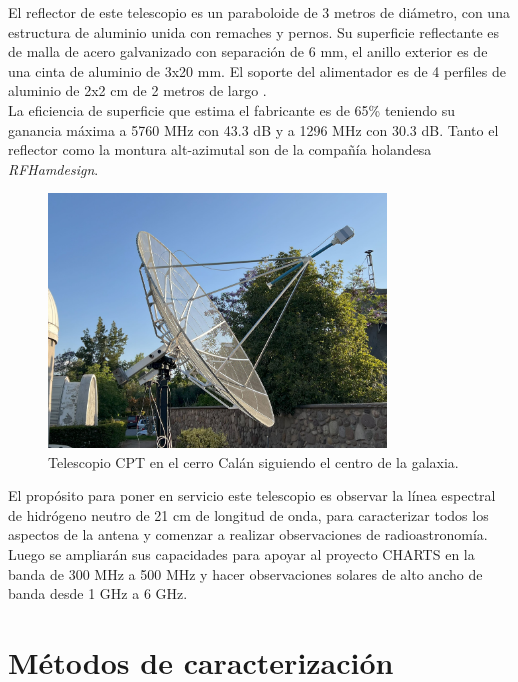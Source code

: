 El reflector de este telescopio es un paraboloide de 3 metros de diámetro, con una estructura de aluminio unida con remaches y pernos. Su superficie reflectante es de malla de acero galvanizado con separación de 6 mm, el anillo exterior es de una cinta de aluminio de 3x20 mm. El soporte del alimentador es de 4 perfiles de aluminio de 2x2 cm de 2 metros de largo \cite{rfhamdesign3meterdish}.\\

La eficiencia de superficie que estima el fabricante es de 65\% teniendo su ganancia máxima a 5760 MHz con 43.3 dB y a 1296 MHz con 30.3 dB. Tanto el reflector como la montura alt-azimutal son de la compañía holandesa \textit{RFHamdesign}.\\

\begin{figure}
    \centering
    \includegraphics[width = 0.8\textwidth]{img/cpt_tracking}
    \caption{Telescopio CPT en el cerro Calán siguiendo el centro de la galaxia.}
    \label{fig:cpt}
\end{figure}

El propósito para poner en servicio este telescopio es observar la línea espectral de hidrógeno neutro de 21 cm de longitud de onda, para caracterizar todos los aspectos de la antena y comenzar a realizar observaciones de radioastronomía. Luego se ampliarán sus capacidades para apoyar al proyecto CHARTS en la banda de 300 MHz a 500 MHz y hacer observaciones solares de alto ancho de banda desde 1 GHz a 6 GHz.\\

\section{Métodos de caracterización}


